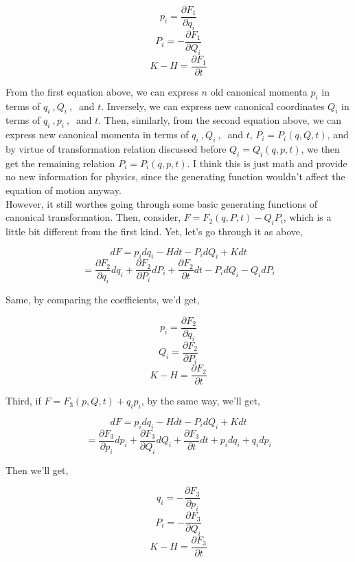 \documentclass[12pt]{article}
\numberwithin{equation}{section}
\begin{document}
\begin{center}
    \[ p_i = \frac{\partial F_1}{\partial q_i} \]
    \[ P_i = -\frac{\partial F_1}{\partial Q_i } \]
    \[ K - H = \frac{\partial F_1}{\partial t} \]
\end{center}

From the first equation above, we can express $n$ old canonical momenta $p_i$ in terms of $q_i\ , Q_i\ ,\ $ and $t$. Inversely, we can express new canonical coordinates $Q_i$ in terms of $q_i\ ,p_i\ ,\ $ and $t$. Then, similarly, from the second equation above, we can express new canonical momenta in terms of $q_i\ ,Q_i\ ,\ $ and $t$, $P_i = P_i(q, Q, t)$, and by virtue of transformation relation discussed before $Q_i = Q_i(q, p, t)$, we then get the remaining relation $P_i = P_i(q, p, t)$. I think this is just math and provide no new information for physics, since the generating function wouldn't affect the equation of motion anyway.
\\
\indent However, it still worthes going through some basic generating functions of canonical transformation. Then, consider, $F = F_2(q, P ,t) - Q_iP_i$, which is a little bit different from the first kind. Yet, let's go through it as above,

\begin{center}
    \[ dF = p_idq_i - Hdt - P_idQ_i + Kdt \]
    \[ = \frac{\partial F_2}{\partial q_i}dq_i + \frac{\partial F_2}{\partial P_i}dP_i + \frac{\partial F_2}{\partial t}dt - P_idQ_i - Q_idP_i \]
\end{center}

Same, by comparing the coefficients, we'd get,

\begin{center}
    \[ p_i = \frac{\partial F_2}{\partial q_i} \]
    \[ Q_i = \frac{\partial F_2}{\partial P_i} \]
    \[ K -H = \frac{\partial F_2}{\partial t} \]
\end{center}

Third, if $ F = F_3(p, Q, t) + q_ip_i $, by the same way, we'll get,

\begin{center}
    \[ dF = p_idq_i - Hdt - P_idQ_i + Kdt \]
    \[ = \frac{\partial F_3}{\partial p_i}dp_i + \frac{\partial F_3}{\partial Q_i}dQ_i + \frac{\partial F_3}{\partial t}dt + p_idq_i + q_idp_i \]
\end{center}

Then we'll get,

\begin{center}
    \[ q_i = - \frac{\partial F_3}{\partial p_i} \]
    \[ P_i = - \frac{\partial F_3}{\partial Q_i} \]
    \[ K - H = \frac{\partial F_3}{\partial t} \]
\end{center}
\end{document}
